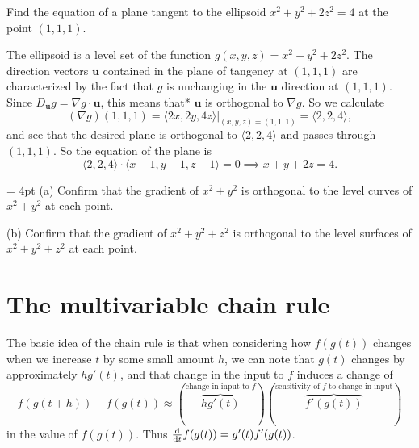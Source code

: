 \documentclass[prettycode,shellescape]{watsonbook}
\begin{document}
\begin{example}{}{}
  Find the equation of a plane tangent to the ellipsoid $x^2 + y^2 +
  2z^2  = 4$ at the point $(1,1,1)$. 
\end{example}

\begin{solution}
  The ellipsoid is a level set of the function
  $g(x,y,z) = x^2 + y^2 + 2z^2$. The direction vectors $\mathbf{u}$
  contained in the plane of tangency at $(1,1,1)$ are characterized
  by the fact that $g$ is unchanging in the $\mathbf{u}$
  direction at $(1,1,1)$. Since
  $D_{\mathbf{u}}g = \nabla g \cdot \mathbf{u}$, this means that*
  $\mathbf{u}$ is orthogonal to $\nabla g$. So we calculate
  \[
    (\nabla g)(1,1,1) = \left.\langle 2x, 2y, 4z \rangle\right|_{(x,y,z) =
      (1,1,1)} = \langle 2, 2, 4 \rangle, 
  \]
  and see that the desired plane is orthogonal to $\langle 2, 2, 4
  \rangle$ and passes through $(1,1,1)$. So the equation of the
  plane is 
  \[
    \langle 2, 2, 4 \rangle \cdot \langle x - 1, y - 1, z - 1
    \rangle = 0 \implies \boxed{x + y + 2z = 4}. 
  \]
\end{solution}

\begin{exercise}{}{} \parskip = 4pt 
  (a) Confirm that the gradient of $x^2 + y^2$ is orthogonal to the level
  curves of $x^2 + y^2$ at each point.

  (b) Confirm that the gradient of
  $x^2 + y^2 + z^2 $ is orthogonal to the level surfaces of
  $x^2 + y^2 + z^2$ at each point.
\end{exercise}

\section{The multivariable chain rule} \label{sec:chainrule} 


The basic idea of the chain rule is that when considering how
$f(g(t))$ changes when we increase $t$ by some small amount $h$, we
can note that $g(t)$ changes by approximately $hg'(t)$, and that
change in the input to $f$ induces a change of
\[
  f(g(t+h)) - f(g(t)) \approx \left(
    \overbrace{hg'(t)}^{\text{change in input to $f$}} 
  \right) \left( 
    \overbrace{f'(g(t))}^{\text{sensitivity of
        $f$ to change in input}}
  \right) 
\]
in the value of $f(g(t))$. Thus $\tfrac{\mathrm{d}}{\mathrm{d} t} f(g(t)) =
g'(t)f'(g(t))$. 
\end{document}
